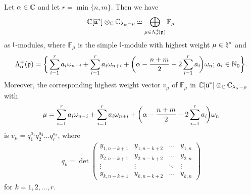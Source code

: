 \begin{proposition}\label{prop:C[u] decomposition AGS}
Let $\alpha \in \mathbb{C}$ and let $r=\min\{n,m\}$. Then we have
\begin{align}
   \mathbb{C}[\overline{\mathfrak{u}}^*] \otimes_{\mathbb{C}} \mathbb{C}_{\lambda_\alpha-\rho} \simeq \bigoplus_{\mu \in \Lambda^+_\alpha\!(\mathfrak{p})} \mathbb{F}_\mu
\end{align}
as $\mathfrak{l}$-modules, where $\mathbb{F}_\mu$ is the simple $\mathfrak{l}$-module with highest weight $\mu \in \mathfrak{h}^*$ and
\begin{align}
 \Lambda^+_\alpha(\mathfrak{p}) = \bigg\{\sum_{i=1}^r a_i \omega_{n-i} + \sum_{i=1}^r a_i \omega_{n+i} + \bigg(\alpha - {n+m \over 2} - 2 \sum_{i=1}^r a_i\!\bigg) \omega_n;\, a_i \in \mathbb{N}_0 \bigg\}.
\end{align}
Moreover, the corresponding highest weight vector $v_\mu$ of $\mathbb{F}_\mu$ in $\mathbb{C}[\overline{\mathfrak{u}}^*] \otimes_{\mathbb{C}} \mathbb{C}_{\lambda_\alpha-\rho}$ with
\begin{align}
\mu=\sum_{i=1}^r a_i \omega_{n-i} + \sum_{i=1}^r a_i \omega_{n+i} + \bigg(\alpha - {n+m \over 2} - 2 \sum_{i=1}^r a_i\!\bigg) \omega_n
\end{align}
is $v_\mu=q_1^{a_1}q_2^{a_2} \dots q_r^{a_r}$, where
\begin{align} \label{eq:generators hwv AGS}
  q_k = \det\!
  \begin{pmatrix}
    y_{1,n-k+1} & y_{1,n-k+2} & \dots & y_{1,n}\\
    y_{2,n-k+1} & y_{2,n-k+2} & \dots & y_{2,n} \\
    \vdots & \vdots & \ddots & \vdots \\
    y_{k,n-k+1} & y_{k,n-k+2}&  \dots & y_{k,n}
  \end{pmatrix}
\end{align}
for $k=1,2,\dots,r$.
\end{proposition}

